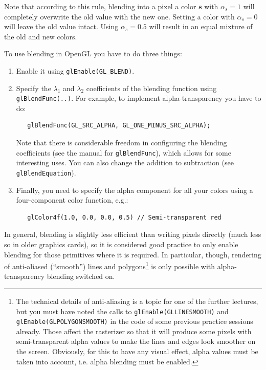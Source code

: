 \documentclass{article}
\newcommand{\bs}{\mathbf{s}}
\begin{document}
Note that according to this rule, blending into a pixel a color $\bs$ with $\alpha_s = 1$ will completely overwrite the old value with the new one. Setting a color with $\alpha_s = 0$ will leave the old value intact. Using $\alpha_s = 0.5$ will result in an equal mixture of the old and new colors.

To use blending in OpenGL you have to do three things:
\begin{enumerate}
\item Enable it using \verb#glEnable(GL_BLEND)#.
\item Specify the $\lambda_1$ and $\lambda_2$ coefficients of the blending function using \\ \texttt{glBlendFunc(..)}. For example, to implement alpha-transparency you have to do:
\begin{verbatim}
   glBlendFunc(GL_SRC_ALPHA, GL_ONE_MINUS_SRC_ALPHA);
\end{verbatim}
Note that there is considerable freedom in configuring the blending coefficients (see the manual for \texttt{glBlendFunc}), which allows for some interesting uses. You can also change the addition to subtraction (see \texttt{glBlendEquation}).
\item Finally, you need to specify the alpha component for all your colors using a four-component color function, e.g.:
\begin{verbatim}
   glColor4f(1.0, 0.0, 0.0, 0.5) // Semi-transparent red
\end{verbatim}
\end{enumerate}
In general, blending is slightly less efficient than writing pixels directly (much less so in older graphics cards), so it is considered good practice to only enable blending for those primitives where it is required. In particular, though, rendering of anti-aliased (``smooth'') lines and polygons\footnote{The technical details of anti-aliasing is a topic for one of the further lectures, but you must have noted the calls to \texttt{glEnable(GL\textunderscore LINE\textunderscore SMOOTH)} and  \texttt{glEnable(GL\textunderscore POLYGON\textunderscore SMOOTH)} in the code of some previous practice sessions already. Those affect the rasterizer so that it will produce some pixels with semi-transparent alpha values to make the lines and edges look smoother on the screen. Obviously, for this to have any visual effect, alpha values must be taken into account, i.e. alpha blending must be enabled.} is only possible with alpha-transparency blending switched on.
\newpage
\end{document}

